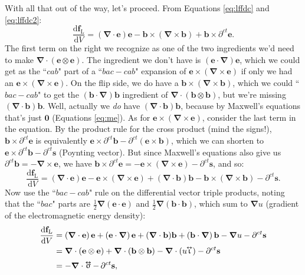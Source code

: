 \documentclass[12pt]{article}
\renewcommand{\vv}[1]{\mathbf{#1}}
\newcommand{\dd}[1]{\mathrm{d}#1}
\newcommand{\del}{\boldsymbol{\nabla}}
\newcommand{\tightoverset}[2]{%
  \mathop{#2}\limits^{\vbox to -.5ex{\kern-0.75ex\hbox{$#1$}\vss}}}
\newcommand{\inlinedy}[1]{\tightoverset{\text{\tiny$\bm\leftrightarrow$}}{#1}}
\begin{document}
With all that out of the way, let's proceed. From Equations \ref{eq:lffdc} and \ref{eq:lffdc2}:
\begin{equation*}
\dfrac{\dd \vv f_{\mathrm{L}}}{\dd V} = \left( \del \cdot \vv e \right) \vv e - \vv b \times \left( \del \times \vv b \right) + \vv b \times \partial^{ct} \vv e .
\end{equation*}
The first term on the right we recognize as one of the two ingredients we'd need to make $\del \cdot (\vv e \otimes \vv e)$. The ingredient we don't have is $(\vv e \cdot \del) \vv e$, which we could get as the ``$cab$" part of a ``$bac - cab$" expansion of $\vv e \times (\del \times \vv e)$ if only we had an $\vv e \times (\del \times \vv e)$. On the flip side, we do have a $\vv b \times (\del \times \vv b)$, which we could ``$bac - cab$" to get the $(\vv b \cdot \del) \vv b$ ingredient of $\del \cdot (\vv b \otimes \vv b)$, but we're missing $(\del \cdot \vv b) \vv b$. Well, actually we \emph{do} have $(\del \cdot \vv b) \vv b$, because by Maxwell's equations that's just $\vv 0$ (Equations \ref{eq:me}). As for $\vv e \times (\del \times \vv e)$, consider the last term in the equation. By the product rule for the cross product (mind the signs!), $\vv b \times \partial^{ct} \vv e$ is equivalently $\vv e \times \partial^{ct} \vv b - \partial^{ct} \left( \vv e \times \vv b \right)$, which we can shorten to $\vv e \times \partial^{ct} \vv b - \partial^{ct} \vv s$ (Poynting vector). But since Maxwell's equations also give us $\partial^{ct} \vv b = - \del \times \vv e$, we have $\vv b \times \partial^{ct} \vv e = - \vv e \times (\del \times \vv e) - \partial^{ct} \vv s$, and so:
\begin{equation*}
\dfrac{\dd \vv f_{\mathrm{L}}}{\dd V} = \left( \del \cdot \vv e \right) \vv e - \vv e \times (\del \times \vv e) + (\del \cdot \vv b) \vv b - \vv b \times \left( \del \times \vv b \right) - \partial^{ct} \vv s .
\end{equation*}
Now use the ``$bac - cab$" rule on the differential vector triple products, noting that the ``$bac$" parts are $\frac{1}{2} \del (\vv e \cdot \vv e)$ and $\frac{1}{2} \del (\vv b \cdot \vv b)$, which sum to $\del u$ (gradient of the electromagnetic energy density):
\begin{equation*}
\begin{aligned}
\dfrac{\dd \vv f_{\mathrm{L}}}{\dd V} &= \left( \del \cdot \vv e \right) \vv e + \left( \vv e \cdot \del \right) \vv e + (\del \cdot \vv b) \vv b + \left( \vv b \cdot \del \right) \vv b - \del u - \partial^{ct} \vv s \\
&= \del \cdot (\vv e \otimes \vv e) + \del \cdot (\vv b \otimes \vv b) - \del \cdot (u \mkern-4.5mu \inlinedy{\upiota}) - \partial^{ct} \vv s \\[2pt]
&= - \del \cdot \inlinedy{\upsigma} - \, \partial^{ct} \vv s ,
\end{aligned}
\end{equation*}
\end{document}
